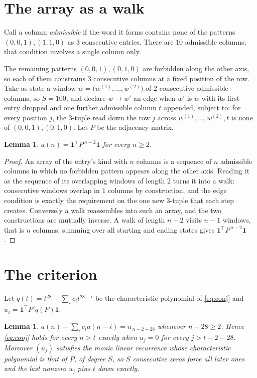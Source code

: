 \documentclass[11pt,a4paper]{article}
\theoremstyle{plain}
\newtheorem{lemma}[theorem]{Lemma}
\theoremstyle{definition}
\begin{document}
\section{The array as a walk}

Call a column \emph{admissible} if the word it forms contains none of the patterns
$(0,0,1), (1,1,0)$ as $3$ consecutive entries. There are $10$ admissible columns; that condition
involves a single column only.

The remaining patterns $(0,0,1), (0,1,0)$ are forbidden along the other axis, so each of them
constrains $3$ consecutive columns at a fixed position of the row. Take as state a
window $w=\bigl(w^{(1)},\dots,w^{(2)}\bigr)$ of $2$ consecutive admissible
columns, so $S=100$, and declare $w\to w'$ an edge when $w'$ is $w$ with its first entry
dropped and one further admissible column $t$ appended, subject to: for every position
$j$, the $3$-tuple read down the row $j$ across $w^{(1)},\dots,w^{(2)},t$
is none of $(0,0,1), (0,1,0)$. Let $P$ be the adjacency matrix.

\begin{lemma}\label{lem:walk}
$a(n)=\mathbf{1}^{\!\top}P^{\,n-2}\mathbf{1}$ for every $n\ge2$.
\end{lemma}

\begin{proof}
An array of the entry's kind with $n$ columns is a sequence of $n$ admissible columns in
which no forbidden pattern appears along the other axis. Reading it as the sequence of its
overlapping windows of length $2$ turns it into a walk: consecutive windows overlap in
$1$ columns by construction, and the edge condition is exactly the requirement on the one
new $3$-tuple that each step creates. Conversely a walk reassembles into such an array,
and the two constructions are mutually inverse. A walk of length $n-2$ visits $n-1$
windows, that is $n$ columns; summing over all starting and ending states gives
$\mathbf{1}^{\!\top}P^{\,n-2}\mathbf{1}$.
\end{proof}

\section{The criterion}

Let $q(t)=t^{28}-\sum_i c_i t^{28-i}$ be the characteristic polynomial of
\eqref{eq:conj} and $u_j=\mathbf{1}^{\!\top}P^{j}q(P)\mathbf{1}$.

\begin{lemma}\label{lem:crit}
$a(n)-\sum_i c_i a(n-i)=u_{\,n-2-28}$ whenever $n-28\ge2$. Hence
\eqref{eq:conj} holds for every $n>t$ exactly when $u_j=0$ for every
$j>t-2-28$. Moreover $(u_j)$ satisfies the monic linear recurrence whose
characteristic polynomial is that of $P$, of degree $S$, so $S$ consecutive zeros force all
later ones and the last nonzero $u_j$ pins $t$ down exactly.
\end{lemma}
\end{document}
